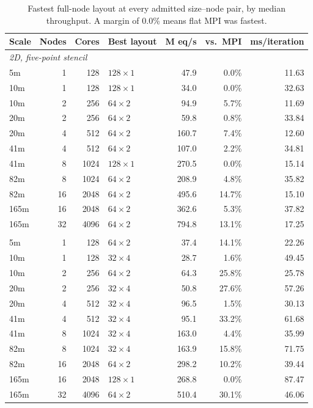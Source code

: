 \documentclass[12pt,a4paper,notitlepage]{report}
\begin{document}
\begin{table}[htbp]
  \centering
  \caption{Fastest full-node layout at every admitted size--node pair, by median throughput. A
  margin of 0.0\% means flat MPI was fastest.}
  \label{tab:weak-best}
  \small
  \begin{tabular}{lrrlrrr}
    \toprule
    Scale & Nodes & Cores & Best layout & M eq/s & vs.\ MPI & ms/iteration \\
    \midrule
    \multicolumn{7}{l}{\emph{2D, five-point stencil}} \\
    5m   &  1 &  128 & $128\times1$ &  47.9 &  0.0\% & 11.63 \\
    10m  &  1 &  128 & $128\times1$ &  34.0 &  0.0\% & 32.63 \\
    10m  &  2 &  256 & $64\times2$  &  94.9 &  5.7\% & 11.69 \\
    20m  &  2 &  256 & $64\times2$  &  59.8 &  0.8\% & 33.84 \\
    20m  &  4 &  512 & $64\times2$  & 160.7 &  7.4\% & 12.60 \\
    41m  &  4 &  512 & $64\times2$  & 107.0 &  2.2\% & 34.81 \\
    41m  &  8 & 1024 & $128\times1$ & 270.5 &  0.0\% & 15.14 \\
    82m  &  8 & 1024 & $64\times2$  & 208.9 &  4.8\% & 35.82 \\
    82m  & 16 & 2048 & $64\times2$  & 495.6 & 14.7\% & 15.10 \\
    165m & 16 & 2048 & $64\times2$  & 362.6 &  5.3\% & 37.82 \\
    165m & 32 & 4096 & $64\times2$  & 794.8 & 13.1\% & 17.25 \\
    \addlinespace
    \multicolumn{7}{l}{\emph{3D, seven-point stencil}} \\
    5m   &  1 &  128 & $64\times2$  &  37.4 & 14.1\% & 22.26 \\
    10m  &  1 &  128 & $32\times4$  &  28.7 &  1.6\% & 49.45 \\
    10m  &  2 &  256 & $64\times2$  &  64.3 & 25.8\% & 25.78 \\
    20m  &  2 &  256 & $32\times4$  &  50.8 & 27.6\% & 57.26 \\
    20m  &  4 &  512 & $32\times4$  &  96.5 &  1.5\% & 30.13 \\
    41m  &  4 &  512 & $32\times4$  &  95.1 & 33.2\% & 61.68 \\
    41m  &  8 & 1024 & $32\times4$  & 163.0 &  4.4\% & 35.99 \\
    82m  &  8 & 1024 & $32\times4$  & 163.9 & 15.8\% & 71.75 \\
    82m  & 16 & 2048 & $64\times2$  & 298.2 & 10.2\% & 39.44 \\
    165m & 16 & 2048 & $128\times1$ & 268.8 &  0.0\% & 87.47 \\
    165m & 32 & 4096 & $64\times2$  & 510.4 & 30.1\% & 46.06 \\
    \bottomrule
  \end{tabular}
\end{table}
\end{document}
